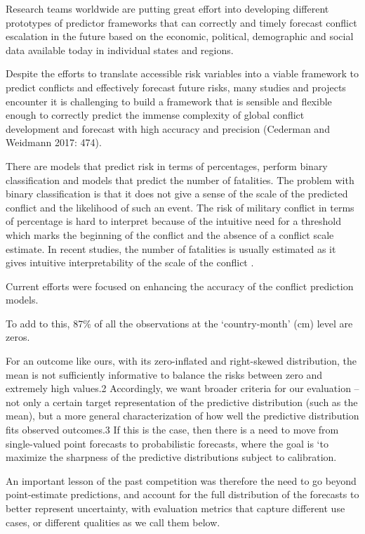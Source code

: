 \documentclass[runningheads]{llncs}
\begin{document}
    Research teams worldwide are putting great effort into developing different prototypes
    of predictor frameworks that can correctly and timely forecast conflict escalation in the
    future based on the economic, political, demographic and social data available today in
    individual states and regions.

    Despite the efforts to translate accessible risk variables into a viable framework to predict conflicts and effectively forecast future risks, many studies and projects encounter
    it is challenging to build a framework that is sensible and flexible enough to correctly predict the immense complexity of global conflict development and forecast with high accuracy and precision (Cederman and Weidmann 2017: 474).


    There are models that predict risk in terms of percentages, perform binary classification and models that predict the number of fatalities. The problem with binary classification is that it does not give a sense of the scale of the predicted conflict and the likelihood of such an event. The risk of military conflict in terms of percentage is hard to interpret because of the intuitive need for a threshold which marks the beginning of the conflict and the absence of a conflict scale estimate. In recent studies, the number of fatalities is usually estimated as it gives intuitive interpretability of the scale of the conflict .

    Current efforts were focused on enhancing the accuracy of the conflict prediction models.

    To add to this, 87\% of all the observations at the ‘country-month’ (cm) level are zeros.

    For an outcome like ours, with its zero-inflated and right-skewed distribution, the mean is not sufficiently informative to balance the risks between zero and extremely high values.2 Accordingly, we want broader criteria for our evaluation – not only a certain target representation of the predictive distribution (such as the mean), but a more general characterization of how well the predictive distribution fits observed outcomes.3 If this is the case, then there is a need to move from single-valued point forecasts to probabilistic forecasts, where the goal is ‘to maximize the sharpness of the predictive distributions subject to calibration.

    An important lesson of the past competition was therefore the need to go beyond point-estimate predictions, and account for the full distribution of the forecasts to better represent uncertainty, with evaluation metrics that capture different use cases, or different qualities as we call them below.
\end{document}
